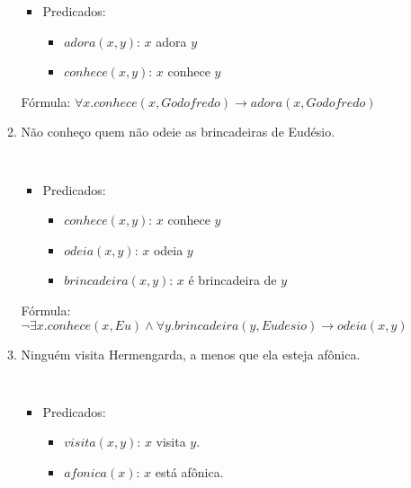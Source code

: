 \documentclass[11pt,a4paper]{report}
\begin{document}
\begin{enumerate}
\begin{enumerate}
\begin{Solucao}
\begin{itemize}
                      \item Predicados:
                        \begin{itemize}
                          \item $adora(x,y)$: $x$ adora $y$
                           \item $conhece(x,y)$: $x$ conhece $y$
                        \end{itemize}
                      \end{itemize}
                      F\'ormula: $\forall x. conhece(x,Godofredo) \to adora(x,Godofredo)$
                    \end{Solucao}
		\item N\~ao conhe\c{c}o quem n\~ao odeie as
                  brincadeiras de Eud\'esio.
                  \begin{Solucao}
                    \verb| |\\
                    \begin{itemize}
                      \item Predicados:
                        \begin{itemize}
                          \item $conhece(x,y)$: $x$ conhece $y$
                            \item $odeia(x,y)$: $x$ odeia $y$
                              \item $brincadeira(x,y)$: $x$ \'e
                                brincadeira de $y$
                          \end{itemize}
                      \end{itemize}
                      F\'ormula: $\neg \exists x. conhece(x,Eu) \land
                      \forall y. brincadeira(y,Eudesio) \to odeia(x,y)$
                    \end{Solucao}
		\item Ningu\'em visita Hermengarda, a menos que ela
                  esteja af\^onica.
                  \begin{Solucao}
                    \verb| |\\
                    \begin{itemize}
                      \item Predicados:
                        \begin{itemize}
                      \item $visita(x,y)$: $x$ visita $y$.
                        \item $afonica(x)$: $x$ est\'a af\^onica.

\end{itemize}
\end{itemize}
\end{Solucao}
\end{enumerate}
\end{enumerate}
\end{document}
